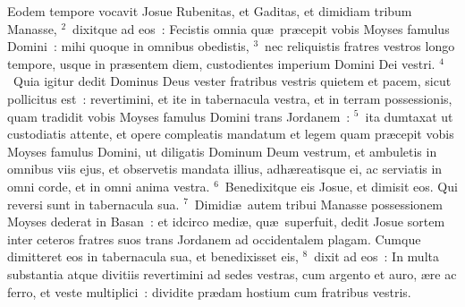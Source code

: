 \lettrine[lines=3,image=true,loversize=0.05,lraise=-0.03]{E}{}odem tempore vocavit Josue Rubenitas, et Gaditas, et dimidiam tribum Manasse,
${}^{2}$~dixitque ad eos~: Fecistis omnia qu\ae\ pr\ae cepit vobis Moyses famulus Domini~: mihi quoque in omnibus obedistis,
${}^{3}$~nec reliquistis fratres vestros longo tempore, usque in pr\ae sentem diem, custodientes imperium Domini Dei vestri.
${}^{4}$~Quia igitur dedit Dominus Deus vester fratribus vestris quietem et pacem, sicut pollicitus est~: revertimini, et ite in tabernacula vestra, et in terram possessionis, quam tradidit vobis Moyses famulus Domini trans Jordanem~:
${}^{5}$~ita dumtaxat ut custodiatis attente, et opere compleatis mandatum et legem quam pr\ae cepit vobis Moyses famulus Domini, ut diligatis Dominum Deum vestrum, et ambuletis in omnibus viis ejus, et observetis mandata illius, adh\ae reatisque ei, ac serviatis in omni corde, et in omni anima vestra.
${}^{6}$~Benedixitque eis Josue, et dimisit eos. Qui reversi sunt in tabernacula sua.
${}^{7}$~Dimidi\ae\ autem tribui Manasse possessionem Moyses dederat in Basan~: et idcirco medi\ae , qu\ae\ superfuit, dedit Josue sortem inter ceteros fratres suos trans Jordanem ad occidentalem plagam. Cumque dimitteret eos in tabernacula sua, et benedixisset eis,
${}^{8}$~dixit ad eos~: In multa substantia atque divitiis revertimini ad sedes vestras, cum argento et auro, \ae re ac ferro, et veste multiplici~: dividite pr\ae dam hostium cum fratribus vestris.


